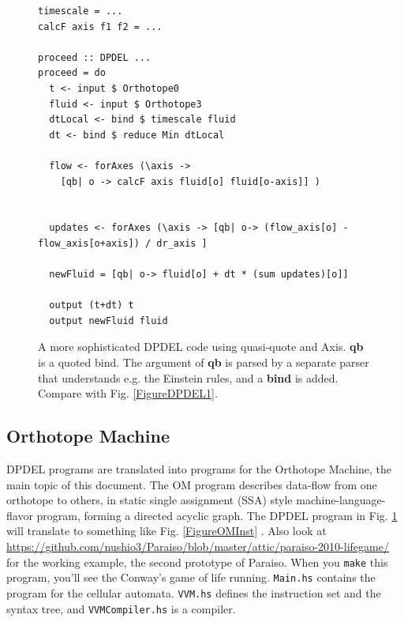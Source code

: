 \documentclass[twocolumn]{article}
\begin{document}
\begin{figure}
\begin{verbatim}
timescale = ...
calcF axis f1 f2 = ...

proceed :: DPDEL ...
proceed = do
  t <- input $ Orthotope0
  fluid <- input $ Orthotope3
  dtLocal <- bind $ timescale fluid
  dt <- bind $ reduce Min dtLocal

  flow <- forAxes (\axis ->
    [qb| o -> calcF axis fluid[o] fluid[o-axis]] )

  
  updates <- forAxes (\axis -> [qb| o-> (flow_axis[o] - flow_axis[o+axis]) / dr_axis ]

  newFluid = [qb| o-> fluid[o] + dt * (sum updates)[o]]

  output (t+dt) t
  output newFluid fluid

\end{verbatim}
\caption{A more sophisticated DPDEL code using quasi-quote and Axis. {\bf qb}
  is a quoted bind. The argument of {\bf qb} is parsed by a separate parser
  that understands e.g. the Einstein rules, and a {\bf bind} is added.
  Compare with Fig. \ref{FigureDPDEL1}.}\label{FigureDPDEL2}
\end{figure}

\subsection{Orthotope Machine}

DPDEL programs are translated into programs for the Orthotope Machine,
the main topic of this document. The OM program describes data-flow
from one orthotope to others, in static single assignment (SSA) style
machine-language-flavor program, forming a directed acyclic graph. The
DPDEL program in Fig. \ref{FigureDPDEL2} will translate to something
like Fig. \ref{FigureOMInst} . Also look at
\url{https://github.com/nushio3/Paraiso/blob/master/attic/paraiso-2010-lifegame/}
for the working example, the second prototype of Paraiso. When you
{\tt make} this program, you'll see the Conway's game of life
running. {\tt Main.hs} contains the program for the cellular
automata. {\tt VVM.hs} defines the instruction set and the syntax
tree, and {\tt VVMCompiler.hs} is a compiler.
\end{document}
